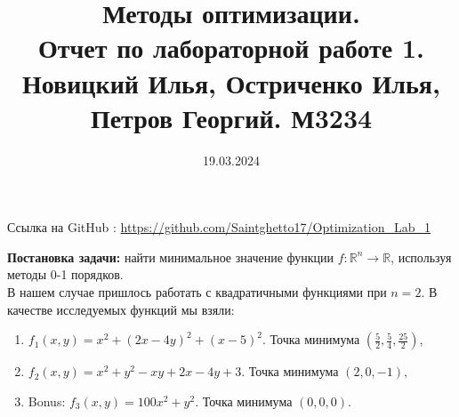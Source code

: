 \documentclass[12pt]{article}
\title{Методы оптимизации.\\ Отчет по лабораторной работе 1. \\Новицкий Илья, Остриченко Илья, Петров Георгий. М3234}
\date{19.03.2024}
\begin{document}
\maketitle

Ссылка на GitHub : \url{https://github.com/Saintghetto17/Optimization_Lab_1}

\textbf{Постановка задачи:} найти минимальное значение функции $f : \mathbb{R}^n  \rightarrow \mathbb{R}$, используя  методы 0-1 порядков. \\
В нашем случае пришлось работать с квадратичными функциями при $n = 2$. В качестве исследуемых функций мы взяли:
\begingroup
\renewcommand\labelenumi{(\theenumi)}
\begin{enumerate}
\item  $f_{1}(x, y) = x ^ 2+ (2x - 4y)^2 + (x-5)^2$. Точка минимума $(\frac{5}{2}, \frac{5}{4}, \frac{25}{2})$, \label{item:1}
\item $f_{2}(x, y) = x^2 + y^2 -xy + 2x - 4y + 3$. Точка минимума $(2, 0, -1), $ 
\item Bonus: $f_{3}(x, y) = 100x^2 + y^2$. Точка минимума $(0, 0, 0).$  
\label{item:2}
\end{enumerate}
\endgroup
\end{document}
